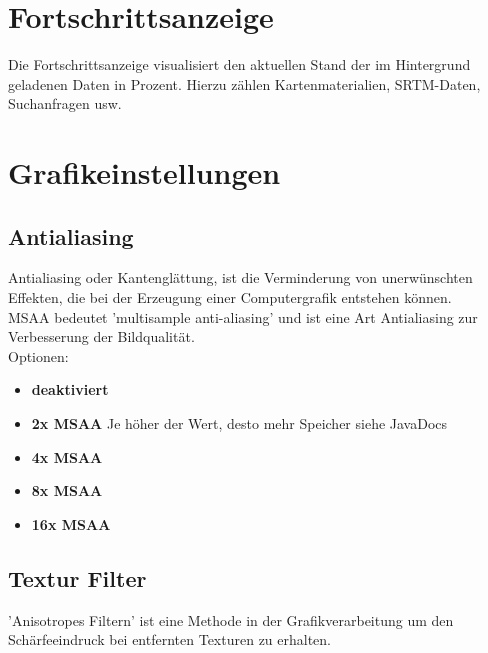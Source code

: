 \documentclass[10pt]{scrreprt}
\begin{document}
\vspace{3mm}
\section{Fortschrittsanzeige} 
Die Fortschrittsanzeige visualisiert den aktuellen Stand der im Hintergrund geladenen Daten in Prozent. Hierzu zählen Kartenmaterialien, SRTM-Daten, Suchanfragen usw.



\vspace{3mm}
\section{Grafikeinstellungen} 

\vspace{3mm}
\subsection{Antialiasing}  

Antialiasing oder Kantenglättung, ist die Verminderung von unerwünschten Effekten, die bei der Erzeugung einer Computergrafik entstehen können.\\

MSAA bedeutet 'multisample anti-aliasing' und ist eine Art Antialiasing zur Verbesserung der Bildqualität.\\

Optionen:
\begin{itemize}
\item \textbf{deaktiviert}
\item \textbf{2x MSAA} Je höher der Wert, desto mehr Speicher siehe JavaDocs
\item \textbf{4x MSAA}
\item \textbf{8x MSAA}
\item \textbf{16x MSAA}
\end{itemize}




\vspace{3mm}
\subsection{Textur Filter}  


'Anisotropes Filtern'  ist eine Methode in der Grafikverarbeitung um den Schärfeeindruck bei entfernten Texturen zu erhalten.\\
\end{document}
